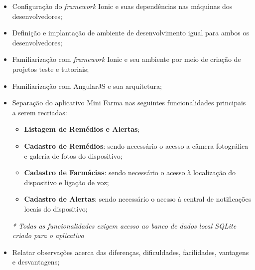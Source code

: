 \begin{itemize}
    \item Configuração do \textit{framework} Ionic e suas dependências nas máquinas dos desenvolvedores;
    \item Definição e implantação de ambiente de desenvolvimento igual para ambos os desenvolvedores;
    \item Familiarização com \textit{framework} Ionic e seu ambiente por meio de criação de projetos teste e tutoriais;
    \item Familiarização com AngularJS e sua arquitetura; 
    \item Separação do aplicativo Mini Farma nas seguintes funcionalidades principais a serem recriadas:
        \begin{itemize}
            \item \textbf{Listagem de Remédios e Alertas};
            \item \textbf{Cadastro de Remédios}: sendo necessário o acesso a câmera fotográfica e galeria de fotos do dispositivo;
            \item \textbf{Cadastro de Farmácias}: sendo necessário o acesso à localização do dispositivo e ligação de voz;
            \item \textbf{Cadastro de Alertas}: sendo necessário o acesso à central de notificações locais do dispositivo;
        \end{itemize}
        \textit{* Todas as funcionalidades exigem acesso ao banco de dados local SQLite criado para o aplicativo}
    \item Relatar observações acerca das diferenças, dificuldades, facilidades, vantagens e desvantagens;
\end{itemize}